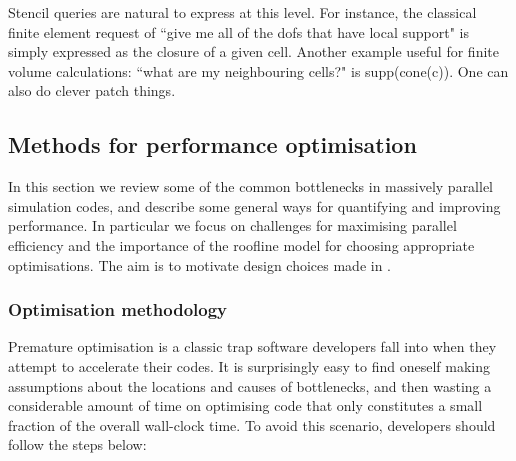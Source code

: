 Stencil queries are natural to express at this level.
For instance, the classical finite element request of ``give me all of the \glspl{dof} that have local support" is simply expressed as the closure of a given cell.
Another example useful for finite volume calculations: ``what are my neighbouring cells?" is supp(cone(c)).
One can also do clever patch things.


\subsection{Methods for performance optimisation}

In this section we review some of the common bottlenecks in massively parallel simulation codes, and describe some general ways for quantifying and improving performance.
In particular we focus on challenges for maximising parallel efficiency and the importance of the roofline model for choosing appropriate optimisations.
The aim is to motivate design choices made in .

\subsubsection{Optimisation methodology}

Premature optimisation is a classic trap software developers fall into when they attempt to accelerate their codes.
It is surprisingly easy to find oneself making assumptions about the locations and causes of bottlenecks, and then wasting a considerable amount of time on optimising code that only constitutes a small fraction of the overall wall-clock time.
To avoid this scenario, developers should follow the steps below:

